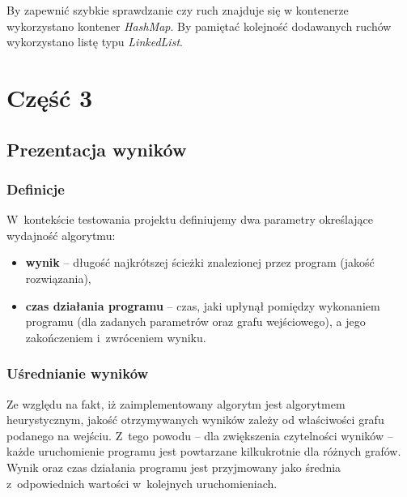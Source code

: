 \documentclass[11pt,a4paper]{article}
\begin{document}
By zapewnić szybkie sprawdzanie czy ruch znajduje się w kontenerze wykorzystano kontener \textit{HashMap}. By pamiętać kolejność dodawanych ruchów wykorzystano listę typu \textit{LinkedList}.

\newpage
\section{Część 3}
\subsection{Prezentacja wyników}
\subsubsection{Definicje}
W~kontekście testowania projektu definiujemy dwa parametry określające wydajność algorytmu:
\begin{itemize}
  \item \textbf{wynik} -- długość najkrótszej ścieżki znalezionej przez program (jakość rozwiązania),
  \item \textbf{czas działania programu} -- czas, jaki upłynął pomiędzy wykonaniem programu (dla zadanych parametrów oraz grafu wejściowego), a jego zakończeniem i~zwróceniem wyniku.
\end{itemize}

\subsubsection{Uśrednianie wyników}
Ze względu na fakt, iż zaimplementowany algorytm jest algorytmem heurystycznym, jakość otrzymywanych wyników zależy od właściwości grafu podanego na wejściu. Z~tego powodu -- dla zwiększenia czytelności wyników -- każde uruchomienie programu jest powtarzane kilkukrotnie dla różnych grafów. Wynik oraz czas działania programu jest przyjmowany jako średnia z~odpowiednich wartości w~kolejnych uruchomieniach.\\
\end{document}
